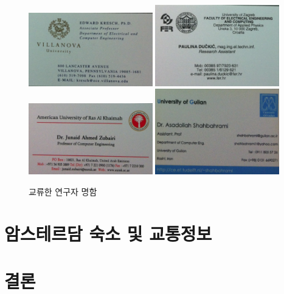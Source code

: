 \documentclass[twocolumn]{article}
\begin{document}
\begin{figure}[htb]
        \centering
        \includegraphics[width=0.48\textwidth]{nc04.png}
        \includegraphics[width=0.48\textwidth]{nc05.png}
        \includegraphics[width=0.48\textwidth]{nc06.png}
        \includegraphics[width=0.48\textwidth]{nc07.png}
        \caption{교류한 연구자 명함}
        \label{fig:namecards02}
\end{figure}

\section{암스테르담 숙소 및 교통정보}

\section{결론}





\end{document}
